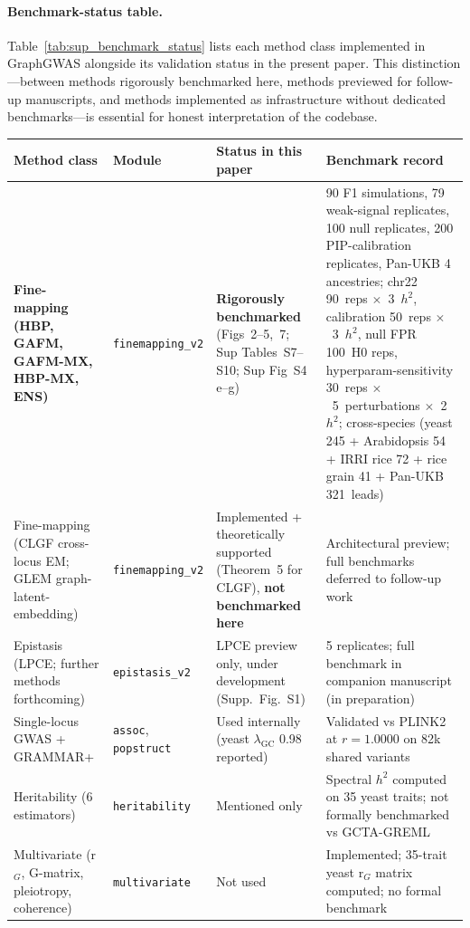 \paragraph{Benchmark-status table.}
Table~\ref{tab:sup_benchmark_status} lists each method class
implemented in GraphGWAS alongside its validation status in the
present paper. This distinction---between methods rigorously
benchmarked here, methods previewed for follow-up manuscripts, and
methods implemented as infrastructure without dedicated
benchmarks---is essential for honest interpretation of the
codebase.

\begin{table}[htbp]
\centering
\small
\begin{tabular}{p{}p{}p{}p{}}
\toprule
Method class & Module & Status in this paper & Benchmark record \\
\midrule
\textbf{Fine-mapping (HBP, GAFM, GAFM-MX, HBP-MX, ENS)} & \texttt{finemapping\_v2} & \textbf{Rigorously benchmarked} (Figs~2--5,~7; Sup Tables~S7--S10; Sup Fig~S4 e--g) & 90 F1 simulations, 79 weak-signal replicates, 100 null replicates, 200 PIP-calibration replicates, Pan-UKB 4 ancestries; chr22 90~reps $\times$~3~$h^2$, calibration 50~reps $\times$~3~$h^2$, null FPR 100~H0 reps, hyperparam-sensitivity 30~reps $\times$~5~perturbations $\times$~2~$h^2$; cross-species (yeast 245 + Arabidopsis 54 + IRRI rice 72 + rice grain 41 + Pan-UKB 321~leads) \\
\midrule
Fine-mapping (CLGF cross-locus EM; GLEM graph-latent-embedding) & \texttt{finemapping\_v2} & Implemented + theoretically supported (Theorem~5 for CLGF), \textbf{not benchmarked here} & Architectural preview; full benchmarks deferred to follow-up work \\
\midrule
Epistasis (LPCE; further methods forthcoming) & \texttt{epistasis\_v2} & LPCE preview only, under development (Supp.~Fig.~S1) & 5 replicates; full benchmark in companion manuscript (in preparation) \\
\midrule
Single-locus GWAS + GRAMMAR+ & \texttt{assoc},\,\texttt{popstruct} & Used internally (yeast $\lambda_{\text{GC}}$ 0.98 reported) & Validated vs PLINK2 at $r = 1.0000$ on 82k shared variants \\
\midrule
Heritability (6 estimators) & \texttt{heritability} & Mentioned only & Spectral $h^2$ computed on 35 yeast traits; not formally benchmarked vs GCTA-GREML \\
\midrule
Multivariate (r$_G$, G-matrix, pleiotropy, coherence) & \texttt{multivariate} & Not used & Implemented; 35-trait yeast r$_G$ matrix computed; no formal benchmark \\

\end{tabular}
\end{table}
